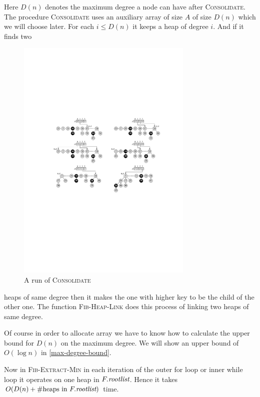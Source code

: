 Here $D(n)$ denotes the maximum degree a node can have after \textsc{Consolidate}. The procedure \textsc{Consolidate} uses an auxiliary array of size $A$ of size $D(n)$ which we will choose later. For each $i\leq D(n)$ it keeps a heap of degree $i$. And if it finds two 
\begin{figure}[h!]
	\centering
	\includegraphics[width=0.75\textwidth]{images/Fibheap2.pdf}
	\caption{A run of \textsc{Consolidate}}
\end{figure}
heaps of same degree then it makes the one with higher key to be the child of the other one. The function \textsc{Fib-Heap-Link} does this process of linking two heaps of same degree.\parinn

Of course in order to allocate array we have to know how to calculate the upper bound for $D(n)$ on the maximum degree. We will show an upper bound of $O(\log n)$ in \autoref{max-degree-bound}.

Now in \textsc{Fib-Extract-Min} in each iteration of the outer for loop or inner while loop it operates on one heap in $F.\emph{rootlist}$. Hence it takes $O(D(n)+\#\text{heaps in $F.\emph{rootlist}$})$ time.


